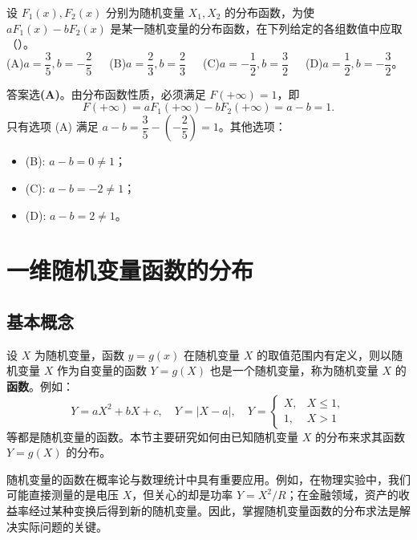 \documentclass[lang=cn,11pt]{elegantbook}
\begin{document}
\begin{exercise}[分布函数线性组合]
设 $F_1(x),F_2(x)$ 分别为随机变量 $X_1,X_2$ 的分布函数，为使 $aF_1(x)-bF_2(x)$ 是某一随机变量的分布函数，在下列给定的各组数值中应取（\quad）。\\
(A)$a=\dfrac{3}{5}, b=-\dfrac{2}{5}$~~~(B)$a=\dfrac{2}{3}, b=\dfrac{2}{3}$~~~(C)$a=-\dfrac{1}{2}, b=\dfrac{3}{2}$~~~(D)$a=\dfrac{1}{2}, b=-\dfrac{3}{2}$。
\end{exercise}
\begin{solution}
答案选\textbf{(A)}。由分布函数性质，必须满足 $F(+\infty)=1$，即
\[
F(+\infty)=aF_1(+\infty)-bF_2(+\infty)=a-b=1.
\]
只有选项 (A) 满足 $a-b=\dfrac{3}{5}-\left(-\dfrac{2}{5}\right)=1$。其他选项：
\begin{itemize}
    \item (B): $a-b=0\neq1$；
    \item (C): $a-b=-2\neq1$；
    \item (D): $a-b=2\neq1$。
\end{itemize}
\end{solution}





\section{一维随机变量函数的分布} \label{sec:random-variable-function}

\subsection{基本概念} \label{subsec:function-concept}

设 $X$ 为随机变量，函数 $y = g(x)$ 在随机变量 $X$ 的取值范围内有定义，则以随机变量 $X$ 作为自变量的函数 $Y = g(X)$ 也是一个随机变量，称为随机变量 $X$ 的\textbf{函数}。例如：
\[
Y = aX^2 + bX + c,\quad Y = |X-a|,\quad Y = \begin{cases} X, & X \le 1, \\ 1, & X > 1 \end{cases}
\]
等都是随机变量的函数。本节主要研究如何由已知随机变量 $X$ 的分布来求其函数 $Y = g(X)$ 的分布。

\begin{note}
随机变量的函数在概率论与数理统计中具有重要应用。例如，在物理实验中，我们可能直接测量的是电压 $X$，但关心的却是功率 $Y = X^2/R$；在金融领域，资产的收益率经过某种变换后得到新的随机变量。因此，掌握随机变量函数的分布求法是解决实际问题的关键。
\end{note}
\end{document}

